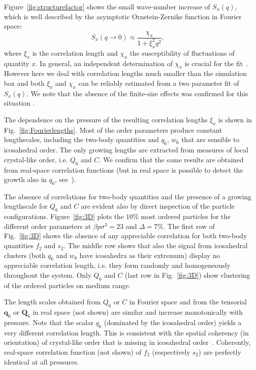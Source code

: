 \documentclass[twocolumn,superscriptaddress]{revtex4}
\begin{document}
Figure~\ref{fig:structurefactor} shows the small wave-number increase of $S_x(q)$, which is well described by the asymptotic Ornstein-Zernike function in Fourier space:
\begin{equation}
	S_x(q\rightarrow 0) \approx \frac{\chi_x}{1+\xi_x^2 q^2},
	\label{eq:OZ_Fourier}
\end{equation}
where $\xi_x$ is the correlation length and $\chi_x$ the susceptibility of fluctuations of quantity $x$. In general, an independent determination of $\chi_x$ is crucial for the fit~\cite{Flenner2011}. However here we deal with correlation lengths much smaller than the simulation box and both $\xi_x$ and $\chi_x$ can be reliably estimated from a two parameter fit of $S_x(q)$. We note that the absence of the finite-size effects was confirmed for this situation \cite{tanaka}.  

The dependence on the pressure of the resulting correlation lengths $\xi_x$ is shown in Fig.~\ref{fig:Fourierlengths}. Most of the order parameters produce constant lengthscales, including the two-body quantities and $q_6$, $w_6$ that are sensible to icosahedral order. The only growing lengths are extracted from measures of local crystal-like order, i.e. $Q_6$ and $C$. We confirm that the same results are obtained from real-space correlation functions (but in
real space is possible to detect the growth also in $q_6$, see~\cite{nota_q6}).

The absence of correlations for two-body quantities and the presence of a growing lengthscale for $Q_6$ and $C$ are evident also by direct inspection of the particle configurations.
Figure~\ref{fig:3D} plots the $10\%$ most ordered particles for the different order parameters at $\beta p\sigma^3=23$ and $\Delta=7\%$. The first row of Fig.~\ref{fig:3D} shows the absence of any
appreciable correlation for both two-body quantities $f_2$ and $s_2$. The middle row shows that also the signal from icosahedral clusters
(both $q_6$ and $w_6$ have icosahedra as their extremum) display no appreciable correlation length, i.e. they form randomly and homogeneously throughout the system. 
Only $Q_6$ and $C$ (last row in Fig.~\ref{fig:3D}) show clustering of the ordered particles on medium range.

The length scales obtained from $Q_6$ or $C$ in Fourier space and from the tensorial $\mathbf{q}_6$ or $\mathbf{Q}_6$ in real space (not shown) are similar and increase monotonically with pressure. Note that the scalar $q_6$ (dominated by the icosahedral order) yields a very different correlation length. This is consistent with the spatial coherency (in orientation) of crystal-like order that is missing in icosahedral order~\cite{tanaka,mathieu_icosahedra}. Coherently, real-space correlation function (not shown) of $f_2$ (respectively $s_2$) are perfectly identical at all pressures. 
\end{document}
